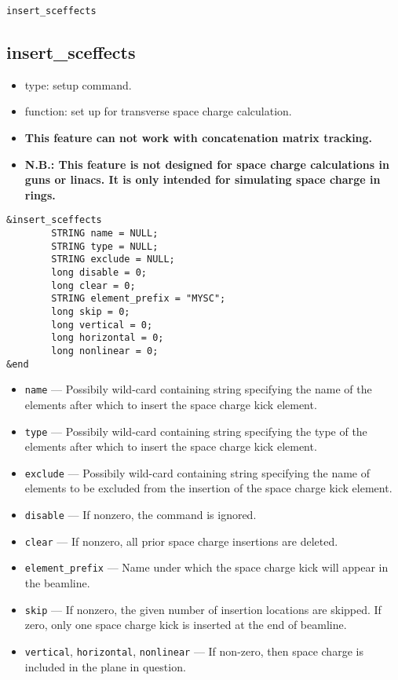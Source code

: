 \documentclass[11pt]{article}
\begin{document}
\begin{latexonly}
\newpage
\begin{center}{\Large\verb|insert_sceffects|}\end{center}
\end{latexonly}
\subsection{insert\_sceffects \label{subsec:insertsceffects}}

\begin{itemize}
\item type: setup command.
\item function: set up for transverse space charge calculation.  
\item {\bf This feature can not work with concatenation matrix tracking.}
\item {\bf
N.B.: This feature is not designed for space charge calculations in
guns or linacs.  It is only intended for simulating space charge in
rings. }
\end{itemize}

\begin{verbatim}
&insert_sceffects
        STRING name = NULL;
        STRING type = NULL;
        STRING exclude = NULL;
        long disable = 0;
        long clear = 0;
        STRING element_prefix = "MYSC";
        long skip = 0;
        long vertical = 0;
        long horizontal = 0;
        long nonlinear = 0;
&end
\end{verbatim}

\begin{itemize}
\item \verb|name| --- Possibily wild-card containing string specifying the
	name of the elements after which to insert the space charge kick element.
\item \verb|type| --- Possibily wild-card containing string specifying the
        type of the elements after which to insert the space charge kick element.
\item \verb|exclude| --- Possibily wild-card containing string specifying 
	the name of elements to be excluded from the insertion of the space charge kick element.
\item \verb|disable| --- If nonzero, the command is ignored.
\item \verb|clear| --- If nonzero, all prior space charge insertions are deleted.
\item \verb|element_prefix| --- Name under which the space charge kick will appear in the beamline.
\item \verb|skip| --- If nonzero, the given number of insertion locations are skipped. 
        If zero, only one space charge kick is inserted at the end of beamline. 
\item \verb|vertical|, \verb|horizontal|, \verb|nonlinear| --- If non-zero, then space charge is
included in the plane in question.
\end{itemize}
\end{document}
